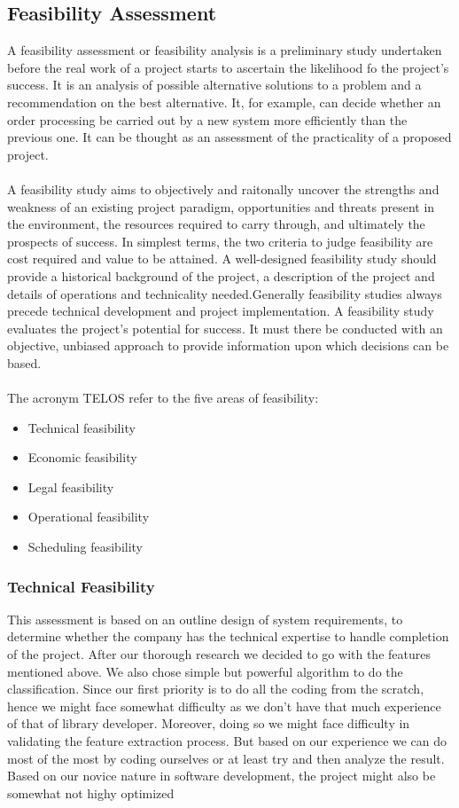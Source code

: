 \subsection{Feasibility Assessment}
A feasibility assessment or feasibility analysis is a preliminary study undertaken before the real work of a project starts to ascertain the likelihood fo the project's success.
It is an analysis of possible alternative solutions to a problem and a recommendation on the best alternative. It, for example, can decide whether an order processing be carried out by a new system more 
efficiently than the previous one. It can be thought as an assessment of the practicality of a proposed project.\\
\\
A feasibility study aims to objectively and raitonally uncover the strengths and weakness of an existing project paradigm, opportunities and threats present in the environment, the resources required to carry through, and ultimately the prospects
of success. In simplest terms, the two criteria to judge feasibility are cost required and value to be attained. A well-designed feasibility study should provide a historical background of the project,
a description of the project and details of operations and technicality needed.Generally feasibility studies always precede technical development and project implementation. A feasibility study evaluates the project's potential for success. It must there be
conducted with an objective, unbiased approach to provide information upon which decisions can be based.\\
\\
The acronym TELOS refer to the five areas of feasibility:
\begin{itemize}
        \item Technical feasibility
        \item Economic feasibility
        \item Legal feasibility
        \item Operational feasibility
        \item Scheduling feasibility
        \end{itemize}

\subsubsection{Technical Feasibility}
This assessment is based on an outline design of system requirements, to determine whether the company has the technical expertise to handle completion of the project.
After our thorough research we decided to go with the features mentioned above. We also chose simple but powerful algorithm to do the classification.
Since our first priority is to do all the coding from the scratch, hence we might face somewhat difficulty as we don't have that much experience of that of library developer.
Moreover, doing so we might face difficulty in validating the feature extraction process.
But based on our experience we can do most of the most by coding ourselves or at least try and then analyze the result. Based on our novice nature in software development, the project might also be somewhat not highy optimized

